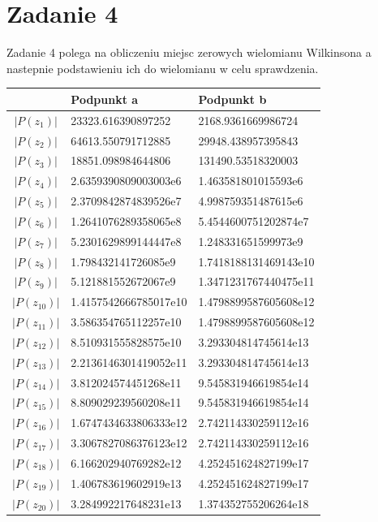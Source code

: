 \documentclass{article} %
\begin{document}
		

	\section*{Zadanie 4} %
		
		Zadanie 4 polega na obliczeniu miejsc zerowych wielomianu Wilkinsona a nastepnie podstawieniu ich do wielomianu w celu sprawdzenia.

		\vspace{0.1cm}
		\begin{tabularx}{\textwidth}{|c|X|X|}
		\hline
		\textbf{} & \textbf{Podpunkt a} & \textbf{Podpunkt b} \\
		\hline
		$|P(z_1)|$ & 23323.616390897252 & 2168.9361669986724 \\
		\hline
		$|P(z_2)|$ & 64613.550791712885 & 29948.438957395843 \\
		\hline
		$|P(z_3)|$ & 18851.098984644806 & 131490.53518320003\\
		\hline
		$|P(z_4)|$ & 2.6359390809003003e6 & 1.463581801015593e6\\
		\hline
		$|P(z_5)|$ & 2.3709842874839526e7 & 4.998759351487615e6\\
		\hline
		$|P(z_6)|$ & 1.2641076289358065e8 & 5.4544600751202874e7 \\
		\hline
		$|P(z_7)|$ & 5.2301629899144447e8 & 1.248331651599973e9 \\
		\hline
		$|P(z_8)|$ & 1.798432141726085e9 & 1.7418188131469143e10 \\
		\hline
		$|P(z_9)|$ & 5.121881552672067e9 & 1.3471231767440475e11 \\
		\hline
		$|P(z_{10})|$ & 1.4157542666785017e10 & 1.4798899587605608e12 \\
		\hline
		$|P(z_{11})|$ & 3.586354765112257e10 & 1.4798899587605608e12 \\
		\hline
		$|P(z_{12})|$ & 8.510931555828575e10 & 3.293304814745614e13 \\
		\hline
		$|P(z_{13})|$ & 2.2136146301419052e11 & 3.293304814745614e13 \\
		\hline
		$|P(z_{14})|$ & 3.812024574451268e11 & 9.545831946619854e14 \\
		\hline
		$|P(z_{15})|$ & 8.809029239560208e11 & 9.545831946619854e14 \\
		\hline
		$|P(z_{16})|$ & 1.6747434633806333e12 & 2.742114330259112e16 \\
		\hline
		$|P(z_{17})|$ & 3.3067827086376123e12 & 2.742114330259112e16 \\
		\hline
		$|P(z_{18})|$ & 6.166202940769282e12 & 4.252451624827199e17 \\
		\hline
		$|P(z_{19})|$ & 1.406783619602919e13 &  4.252451624827199e17 \\
		\hline
		$|P(z_{20})|$ & 3.284992217648231e13 & 1.374352755206264e18 \\
		\hline
		\end{tabularx}
		\vspace{0.1cm}
\end{document}
